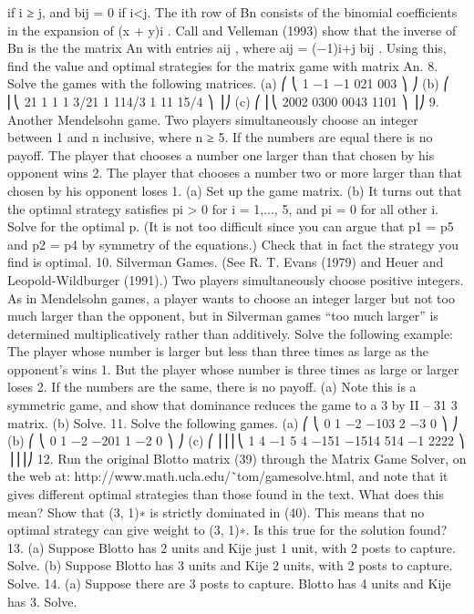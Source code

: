 if i ≥ j, and bij = 0 if i<j.
The ith row of Bn consists of the binomial coefficients in the expansion of (x + y)i
. Call
and Velleman (1993) show that the inverse of Bn is the the matrix An with entries aij ,
where aij = (−1)i+j bij . Using this, find the value and optimal strategies for the matrix
game with matrix An.
8. Solve the games with the following matrices.
(a)
⎛
⎝
1 −1 −1
021
003
⎞
⎠ (b)
⎛
⎜⎝
21 1 1
1 3/21 1
114/3 1
11 15/4
⎞
⎟⎠
(c)
⎛
⎜⎝
2002
0300
0043
1101
⎞
⎟⎠
9. Another Mendelsohn game. Two players simultaneously choose an integer
between 1 and n inclusive, where n ≥ 5. If the numbers are equal there is no payoff. The
player that chooses a number one larger than that chosen by his opponent wins 2. The
player that chooses a number two or more larger than that chosen by his opponent loses
1.
(a) Set up the game matrix.
(b) It turns out that the optimal strategy satisfies pi > 0 for i = 1,..., 5, and pi = 0 for all
other i. Solve for the optimal p. (It is not too difficult since you can argue that p1 = p5
and p2 = p4 by symmetry of the equations.) Check that in fact the strategy you find is
optimal.
10. Silverman Games. (See R. T. Evans (1979) and Heuer and Leopold-Wildburger
(1991).) Two players simultaneously choose positive integers. As in Mendelsohn games, a
player wants to choose an integer larger but not too much larger than the opponent, but in
Silverman games “too much larger” is determined multiplicatively rather than additively.
Solve the following example: The player whose number is larger but less than three times
as large as the opponent’s wins 1. But the player whose number is three times as large or
larger loses 2. If the numbers are the same, there is no payoff.
(a) Note this is a symmetric game, and show that dominance reduces the game to a 3 by
II – 31
3 matrix.
(b) Solve.
11. Solve the following games.
(a)
⎛
⎝
0 1 −2
−103
2 −3 0
⎞
⎠ (b)
⎛
⎝
0 1 −2
−201
1 −2 0
⎞
⎠
(c)
⎛
⎜⎜⎜⎝
1 4 −1 5
4 −151
−1514
514 −1
2222
⎞
⎟⎟⎟⎠
12. Run the original Blotto matrix (39) through the Matrix Game Solver, on the
web at: http://www.math.ucla.edu/˜tom/gamesolve.html, and note that it gives different
optimal strategies than those found in the text. What does this mean? Show that (3, 1)∗ is
strictly dominated in (40). This means that no optimal strategy can give weight to (3, 1)∗.
Is this true for the solution found?
13. (a) Suppose Blotto has 2 units and Kije just 1 unit, with 2 posts to capture.
Solve.
(b) Suppose Blotto has 3 units and Kije 2 units, with 2 posts to capture. Solve.
14. (a) Suppose there are 3 posts to capture. Blotto has 4 units and Kije has 3. Solve.
